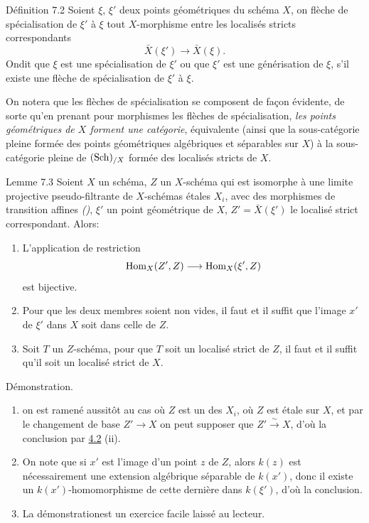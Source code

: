 \documentclass[10pt]{../fichiers-configuration-latex/smfart}
\begin{document}
\begin{enonce*}{Définition 7.2}
Soient $\xi$, $\xi'$ deux points géométriques du schéma $X$, on
 flèche de spécialisation de $\xi'$ à $\xi$ tout $X$-morphisme
entre les localisés stricts correspondants
$$
\bar{X} (\xi') \to \bar{X} (\xi).
$$
On\pageoriginale dit que $\xi$ est une spécialisation de $\xi'$ ou
que $\xi'$ est une générisation de $\xi$, s'il existe une flèche de
spécialisation de $\xi'$ à $\xi$.
\end{enonce*}

On notera que les flèches de spécialisation se composent de façon
évidente, de sorte qu'en prenant pour morphismes les flèches de
spécialisation, \emph{les points géométriques de $X$ forment une
  catégorie}, équivalente (ainsi que la sous-catégorie pleine formée
des points géométriques algébriques et séparables sur $X$) à la
sous-catégorie pleine de $(\operatorname{Sch})_{/X}$ formée des localisés stricts de
$X$.

\begin{enonce*}{Lemme 7.3}
Soient $X$ un schéma, $Z$ un $X$-schéma qui est isomorphe à une
limite projective pseudo-filtrante de $X$-schémas étales $X_{i}$,
avec des morphismes de transition affines
\emph{()}, $\xi'$ un point géométrique de $X$,
$Z' = \bar{X} (\xi')$ le localisé strict correspondant. Alors:
\begin{enumerate}
\renewcommand{\theenumi}{\alph{enumi}}
\renewcommand{\labelenumi}{\theenumi)}
\item L'application de restriction
$$
\Hom_X (Z', Z) \to \Hom_X(\xi', Z)
$$
est bijective.

\item Pour que les deux membres soient non vides, il faut et il suffit
  que l'image $x'$ de $\xi'$ dans $X$ soit dans celle de $Z$.

\item Soit $T$ un $Z$-schéma, pour que $T$ soit un localisé strict de
  $Z$, il faut et il suffit qu'il soit un localisé strict de $X$.
\end{enumerate}
\end{enonce*}

Démonstration.
\begin{enumerate}
\renewcommand{\theenumi}{\alph{enumi}}
\renewcommand{\labelenumi}{\theenumi)}
\item on est ramené aussitôt au cas où $Z$ est un des $X_i$, \ie où
  $Z$ est étale sur $X$, et par le changement de base $Z'\to X$ on
  peut supposer que $Z'\xrightarrow{\sim} X$, d'où la conclusion par
  \hyperref[VIII.def4.2]{4.2} (ii).

\item On note que si $x'$ est l'image d'un point $z$ de $Z$, alors
  $k(z)$ est nécessairement une extension algébrique séparable de
  $k(x')$, donc il existe un $k(x')$-homomorphisme de cette dernière
  dans $k(\xi')$, d'où la conclusion.

\item La démonstration\pageoriginale est un exercice facile
  laissé au lecteur.
\end{enumerate}
\end{document}
